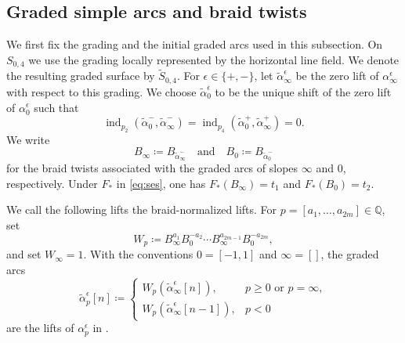 \documentclass[11pt,a4paper,reqno]{amsart}%
\theoremstyle{plain}
\theoremstyle{definition}
\numberwithin{equation}{section}
\numberwithin{equation}{section}
\def\QQ{\mathbb{Q}}
\newcommand{\gind}{\operatorname{ind}\nolimits}
\begin{document}
\subsection{Graded simple arcs and braid twists}
We first fix the grading and the initial graded arcs used in this subsection. On $S_{0,4}$ we use the grading locally represented by the horizontal line field. We denote the resulting graded surface by $\widetilde{S}_{0,4}$. For $\epsilon\in\{+,-\}$, let $\widetilde{\alpha}_\infty^\epsilon$ be the zero lift of $\alpha_\infty^\epsilon$ with respect to this grading. We choose $\widetilde{\alpha}_0^\epsilon$ to be the unique shift of the zero lift of $\alpha_0^\epsilon$ such that
\[
\gind_{p_2}(\widetilde{\alpha}_0^{-},\widetilde{\alpha}_\infty^{-})=
\gind_{p_4}(\widetilde{\alpha}_0^{+},\widetilde{\alpha}_\infty^{+})=0.
\]
We write
\[
B_\infty \coloneqq B_{\widetilde{\alpha}_{\infty}^{-}}
\quad\text{and}\quad
B_0 \coloneqq B_{\widetilde{\alpha}_{0}^{-}}
\]
for the braid twists associated with the graded arcs of slopes $\infty$ and $0$, respectively. Under $F_*$ in \eqref{eq:ses}, one has $F_*(B_\infty)=t_1$ and $F_*(B_0)=t_2$.

We call the following lifts the braid-normalized lifts.
For $p=[a_1,\ldots,a_{2m}]\in\QQ$, set
\[
W_p\coloneqq B_\infty^{a_1}B_0^{-a_2}\cdots B_\infty^{a_{2m-1}}B_0^{-a_{2m}},
\]
and set $W_\infty=1$. With the conventions $0=[-1,1]$ and $\infty=[]$, the graded arcs
\begin{equation}\label{eq:braid-normalized-lifts}
\widetilde{\alpha}_p^\epsilon[n]\coloneqq
\begin{cases}
W_p(\widetilde{\alpha}_\infty^\epsilon[n]),& p\ge 0\text{ or }p=\infty,\\[4pt]
W_p(\widetilde{\alpha}_\infty^\epsilon[n-1]),& p<0
\end{cases}
\end{equation}
are the lifts of $\alpha_p^\epsilon$ in .
\end{document}

